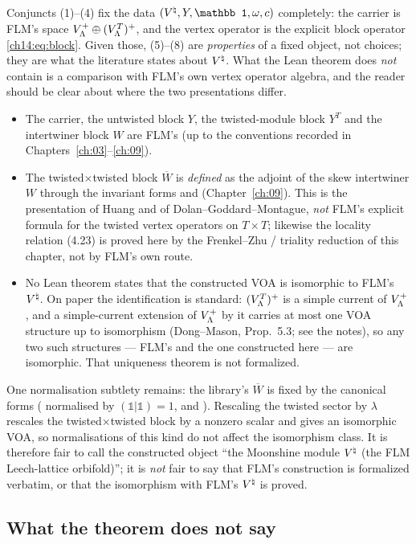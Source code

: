 Conjuncts (1)--(4) fix the data $(\Vnat,Y,\mathbb 1,\omega,c)$ completely: the carrier is FLM's space
$V_{\Lambda}^+\oplus(V_{\Lambda}^T)^+$, and the vertex operator is the explicit block operator
\eqref{ch14:eq:block}.  Given those, (5)--(8) are \emph{properties} of a fixed object, not choices; they are
what the literature states about ${V^{\natural}}$.  What the Lean theorem does \emph{not} contain is a comparison
with FLM's own vertex operator algebra, and the reader should be clear about where the two presentations
differ.
\begin{itemize}
\item The carrier, the untwisted block $Y$, the twisted-module block $Y^T$ and the intertwiner block $W$
  are FLM's (up to the conventions recorded in Chapters~\ref{ch:03}--\ref{ch:09}).
\item The twisted$\times$twisted block $\overline W$ is \emph{defined} as the adjoint of the skew intertwiner
  $W$ through the invariant forms  and  (Chapter~\ref{ch:09}).  This is the
  presentation of Huang and of Dolan--Goddard--Montague, \emph{not} FLM's explicit formula for the twisted
  vertex operators on $T\times T$; likewise the locality relation (4.23) is proved here by the
  Frenkel--Zhu / triality reduction of this chapter, not by FLM's own route.
\item No Lean theorem states that the constructed VOA is isomorphic to FLM's ${V^{\natural}}$.  On paper the
  identification is standard: $(V_{\Lambda}^T)^+$ is a simple current of $V_{\Lambda}^+$, and a simple-current
  extension of $V_{\Lambda}^+$ by it carries at most one VOA structure up to isomorphism (Dong--Mason, Prop.~5.3; see the
  notes), so any two such structures — FLM's and the one constructed here — are isomorphic.  That
  uniqueness theorem is not formalized.
\end{itemize}
One normalisation subtlety remains: the library's $\overline W$ is fixed by the canonical forms
( normalised by $(\mathbb 1|\mathbb 1)=1$, and ).  Rescaling the twisted sector by
$\lambda$ rescales the twisted$\times$twisted block by a nonzero scalar and gives an isomorphic VOA, so
normalisations of this kind do not affect the isomorphism class.  It is therefore fair to call the
constructed object ``the Moonshine module ${V^{\natural}}$ (the FLM Leech-lattice orbifold)''; it is \emph{not} fair
to say that FLM's construction is formalized verbatim, or that the isomorphism with FLM's ${V^{\natural}}$ is proved.

\subsection{What the theorem does not say}

